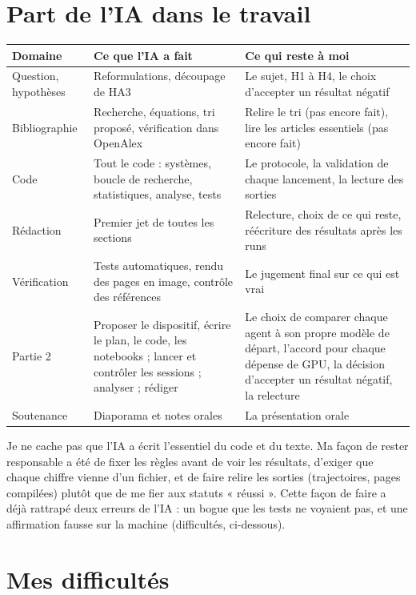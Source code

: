 \documentclass[10pt,a4paper]{article}
\begin{document}
\section{Part de l'IA dans le travail}

\small
\begin{longtable}{@{}P{3.2cm}P{6.3cm}P{6.3cm}@{}}
\toprule
Domaine & Ce que l'IA a fait & Ce qui reste à moi\\
\midrule\endhead
Question, hypothèses & Reformulations, découpage de HA3 & Le sujet, H1 à H4, le choix d'accepter un résultat négatif\\
Bibliographie & Recherche, équations, tri proposé, vérification dans OpenAlex & Relire le tri (pas encore fait), lire les articles essentiels (pas encore fait)\\
Code & Tout le code : systèmes, boucle de recherche, statistiques, analyse, tests & Le protocole, la validation de chaque lancement, la lecture des sorties\\
Rédaction & Premier jet de toutes les sections & Relecture, choix de ce qui reste, réécriture des résultats après les runs\\
Vérification & Tests automatiques, rendu des pages en image, contrôle des références & Le jugement final sur ce qui est vrai\\
Partie 2 & Proposer le dispositif, écrire le plan, le code, les notebooks ; lancer et contrôler les sessions ; analyser ; rédiger & Le choix de comparer chaque agent à son propre modèle de départ, l'accord pour chaque dépense de GPU, la décision d'accepter un résultat négatif, la relecture\\
Soutenance & Diaporama et notes orales & La présentation orale\\
\bottomrule
\end{longtable}
\normalsize

Je ne cache pas que l'IA a écrit l'essentiel du code et du texte. Ma façon de rester responsable a été de fixer les règles avant de voir les résultats, d'exiger que chaque chiffre vienne d'un fichier, et de faire relire les sorties (trajectoires, pages compilées) plutôt que de me fier aux statuts « réussi ». Cette façon de faire a déjà rattrapé deux erreurs de l'IA : un bogue que les tests ne voyaient pas, et une affirmation fausse sur la machine (difficultés, ci-dessous).

\section{Mes difficultés}\label{sec:difficultes}
\end{document}
